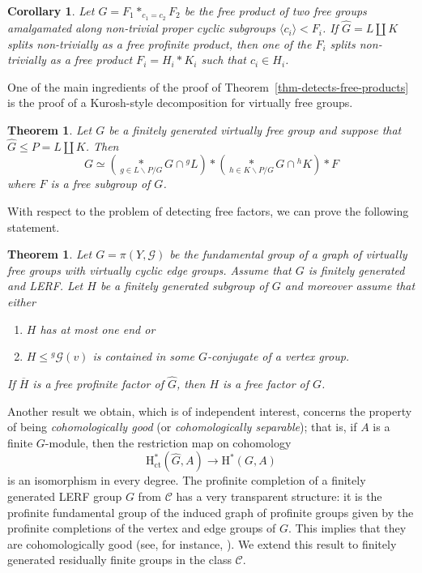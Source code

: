 \documentclass[a4paper]{amsart}
\newtheorem{teo}[lem]{Theorem}
\newtheorem{cor}[lem]{Corollary}
\theoremstyle{definition}
\theoremstyle{remark}
\newcommand{\G}{\mathcal G}
\begin{document}
\begin{cor}\label{cor-relative-splitting} Let  \(G = F_1 *_{c_1 = c_2} F_2 \) be the free product of two free groups amalgamated along non-trivial proper cyclic subgroups  \( \langle c_i  \rangle  < F_i \). If  \( \widehat{G}  = L  \amalg K \) splits non-trivially as a free profinite product, then one of the  \(F_i \) splits non-trivially as a free product  \(F_i = H_i * K_i \) such that  \(c_i  \in H_i \).
\end{cor}

One of the main ingredients of the proof of Theorem~\ref{thm-detects-free-products} is the proof of a Kurosh-style decomposition for virtually free groups. 

\begin{teo}\label{thm-relative-splitting-virtually-free-groups} Let \(G\) be a finitely generated virtually free group and suppose that \(\widehat{G} \leq P = L \amalg K\). Then \[G \simeq \left(\underset{g \in L\backslash P/G}{\ast} G \cap {^gL}\right)*\left(\underset{h \in K \backslash P/ G}{\ast} G \cap {^hK}\right)*F\] where \(F\) is a free subgroup of \(G\).
\end{teo}

With respect to the problem of detecting free factors, we can prove the following statement.

\begin{teo}\label{oneendedH} Let \(G = \pi(Y,\G)\) be the fundamental group of a graph of virtually free groups with virtually cyclic edge groups. Assume that \(G\) is finitely generated and LERF. Let \(H\) be a finitely generated subgroup of \(G\) and moreover assume that either
\begin{enumerate}
    \item \(H\) has at most one end or
    \item \(H \leq {^ g\G(v)}\) is contained in some \(G\)-conjugate of a vertex group.
\end{enumerate}
If \(\overline{H}\) is a free profinite factor of \(\widehat{G}\), then \(H\) is a free factor of \(G\).
\end{teo}

Another result we obtain, which is of independent interest, concerns the property of being \emph{cohomologically good} (or \emph{cohomologically separable}); that is, if \(A\) is a finite \(G\)-module, then the restriction map on cohomology
\[
\mathrm{H}_{\mathrm{ct}}^*(\widehat{G}, A) \to \mathrm{H}^*(G, A)
\]
is an isomorphism in every degree.
 The profinite completion of a finitely generated LERF group \(G\) from \(\mathcal{C}\) has a very transparent structure: it is the profinite fundamental group of the induced graph of profinite groups given by the profinite completions of the vertex and edge groups of \(G\). This implies that they are cohomologically good (see, for instance, \cite[Thm. 3.9]{Grunewald2008}). We extend this result to finitely generated residually finite groups in the class \(\mathcal{C}\).
\end{document}
